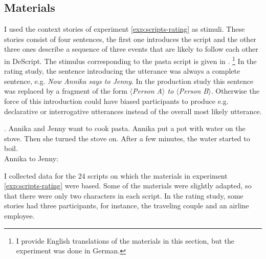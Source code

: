 \subsection{Materials}
I used the context stories of experiment \ref{exp:scripts-rating} as stimuli. These stories consist of four sentences, the first one introduces the script and the other three ones describe a sequence of three events that are likely to follow each other in DeScript. The stimulus corresponding to the pasta script is given in \Next.%
%
\footnote{I provide English translations of the materials in this section, but the experiment was done in German.}\afterfn%
% 
In the rating study, the sentence introducing the utterance was always a complete sentence, e.g. \textit{Now Annika says to Jenny}. In the production study this sentence was replaced by a fragment of the form \textit{$\langle$Person A$\rangle$ to $\langle$Person B$\rangle$}. Otherwise the force of this introduction could have biased participants to produce e.g. declarative or interrogative utterances instead of the overall most likely utterance.

\ex. Annika and Jenny want to cook pasta. Annika put a pot with water on the stove. Then she turned the stove on. After a few minutes, the water started to boil. \\Annika to Jenny: \label{ex:scripts-production-item}

I collected data for the 24 scripts on which the materials in experiment \ref{exp:scripts-rating} were based. Some of the materials were slightly adapted, so that there were only two characters in each script. In the rating study, some stories had three participants, for instance, the traveling couple and an airline employee. %

